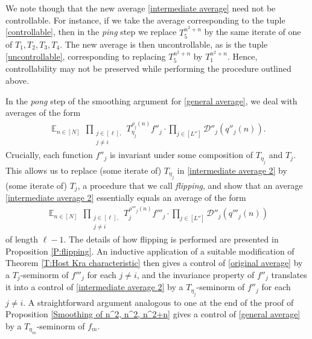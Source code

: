 \documentclass[11pt]{amsart}
\theoremstyle{definition}
\newcommand{\CD}{{\mathcal D}}
\newcommand{\FD}{{\mathfrak D}}
\DeclareMathOperator*{\E}{\mathbb{E}}
\begin{document}
We note though that the new average \eqref{intermediate average} need not be controllable. For instance, if we take the average corresponding to the tuple \eqref{controllable}, then in the \textit{ping} step we replace $T_5^{n^2+n}$ by the same iterate of one of $T_1, T_2, T_3, T_4$. The new average is then uncontrollable, as is the tuple \eqref{uncontrollable}, corresponding to replacing $T_5^{n^2+n}$ by $T_1^{n^2+n}$. Hence, controllability may not be preserved while performing the procedure outlined above.

In the \textit{pong} step of the smoothing argument for \eqref{general average}, we deal with averages of the form
\begin{align}\label{intermediate average 2}
    \E_{n\in [N]} \,\prod_{\substack{j\in[\ell],\\ j\neq i}}T_{\eta_j}^{\rho_j(n)}f''_j \cdot \prod_{j\in[L'']}\CD''_{j}(q''_j(n)).
\end{align}
Crucially, each function $f''_j$ is invariant under some composition of $T_{\eta_j}$ and $T_j$. This allows us to replace (some iterate of) $T_{\eta_j}$ in \eqref{intermediate average 2} by (some iterate of) $T_j$, a procedure that we call \emph{flipping}, and show that an average \eqref{intermediate average 2} essentially equals an average of the form
\begin{align}\label{original average}
    \E_{n\in [N]} \,\prod_{\substack{j\in[\ell],\\ j\neq i}}T_j^{\rho'''_j(n)}f'''_j \cdot \prod_{j\in[L'']}\CD''_{j}(q'''_j(n))
\end{align}
of length $\ell -1$. The details of how flipping is performed are presented in Proposition \ref{P:flipping}. An inductive application of a suitable modification of Theorem \ref{T:Host Kra characteristic} then gives a control of \eqref{original average} by a $T_j$-seminorm of $f'''_j$ for each $j\neq i$, and the invariance property of $f''_j$ translates it into a control of \eqref{intermediate average 2} by a $T_{\eta_j}$-seminorm of $f''_j$ for each $j\neq i$. A straightforward argument analogous to one at the end of the proof of Proposition \ref{Smoothing of n^2, n^2, n^2+n} gives a control of \eqref{general average}  by a $T_{\eta_m}$-seminorm of $f_m$.
\end{document}
